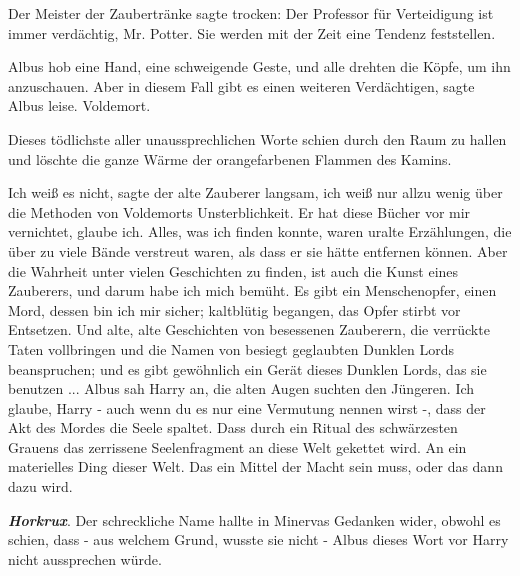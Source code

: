 Der Meister der Zaubertränke sagte trocken: \glqq Der Professor für Verteidigung
ist immer verdächtig, Mr. Potter. Sie werden mit der Zeit eine Tendenz
feststellen.\grqq{}

Albus hob eine Hand, eine schweigende Geste, und alle drehten die Köpfe, um ihn
anzuschauen. \glqq Aber in diesem Fall gibt es einen weiteren
Verdächtigen\grqq{}, sagte Albus leise. \glqq Voldemort.\grqq{}

Dieses tödlichste aller unaussprechlichen Worte schien durch den Raum zu hallen
und löschte die ganze Wärme der orangefarbenen Flammen des Kamins.

\glqq Ich weiß es nicht\grqq{}, sagte der alte Zauberer langsam, \glqq ich weiß
nur allzu wenig über die Methoden von Voldemorts Unsterblichkeit. Er hat diese
Bücher vor mir vernichtet, glaube ich. Alles, was ich finden konnte, waren
uralte Erzählungen, die über zu viele Bände verstreut waren, als dass er sie
hätte entfernen können. Aber die Wahrheit unter vielen Geschichten zu finden,
ist auch die Kunst eines Zauberers, und darum habe ich mich bemüht. Es gibt ein
Menschenopfer, einen Mord, dessen bin ich mir sicher; kaltblütig begangen, das
Opfer stirbt vor Entsetzen. Und alte, alte Geschichten von besessenen Zauberern,
die verrückte Taten vollbringen und die Namen von besiegt geglaubten Dunklen
Lords beanspruchen; und es gibt gewöhnlich ein Gerät dieses Dunklen Lords, das
sie benutzen ...\grqq{} Albus sah Harry an, die alten Augen suchten den
Jüngeren. \glqq Ich glaube, Harry - auch wenn du es nur eine Vermutung nennen
wirst -, dass der Akt des Mordes die Seele spaltet. Dass durch ein Ritual des
schwärzesten Grauens das zerrissene Seelenfragment an diese Welt gekettet wird.
An ein materielles Ding dieser Welt. Das ein Mittel der Macht sein muss, oder
das dann dazu wird.\grqq{}

\textbf{\emph{Horkrux}}. Der schreckliche Name hallte in Minervas Gedanken
wider, obwohl es schien, dass - aus welchem Grund, wusste sie nicht - Albus
dieses Wort vor Harry nicht aussprechen würde.

